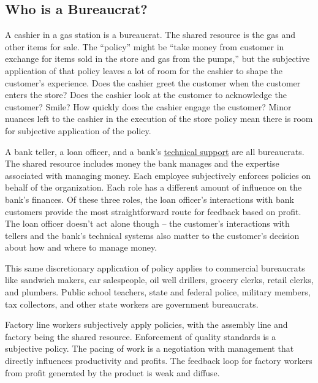 \subsection*{Who is a Bureaucrat?}

A cashier in a gas station is a bureaucrat. 
The shared resource is the gas and other items for sale. The ``policy'' might be ``take money from customer in exchange for items sold in the store and gas from the pumps,'' but the subjective application of that policy leaves a lot of room for the cashier to shape the customer's experience. Does the cashier greet the customer when the customer enters the store? Does the cashier look at the customer to acknowledge the customer? Smile? How quickly does the cashier engage the customer? Minor nuances left to the cashier in the execution of the store policy mean there is room for subjective application of the policy. 

A bank teller, a loan officer, and a bank's \href{https://en.wikipedia.org/wiki/Technical_support}{technical support} 
\iftoggle{WPinmargin}{\marginpar{$>$Wikipedia: Technical support}}{}
are all bureaucrats. 
The shared resource includes money the bank manages and the expertise associated with managing money. Each employee subjectively enforces policies on behalf of the organization. Each role has a different amount of influence on the bank's finances. Of these three roles, the loan officer's interactions with bank customers provide the most straightforward route for feedback based on profit. The loan officer doesn't act alone though -- the customer's interactions with tellers and the bank's technical systems also matter to the customer's decision about how and where to manage money. 


This same discretionary application of policy applies to commercial bureaucrats like sandwich makers, car salespeople, oil well drillers, grocery clerks, retail clerks, 
and plumbers. Public school teachers, state and federal police, 
military members, 
tax collectors, and other state workers are government bureaucrats. 


Factory line workers subjectively apply policies, with the assembly line and factory being the shared resource. Enforcement of quality standards is a subjective policy. The pacing of work is a negotiation with management that directly influences productivity and profits. The feedback loop for factory workers from profit generated by the product is weak and diffuse. %

